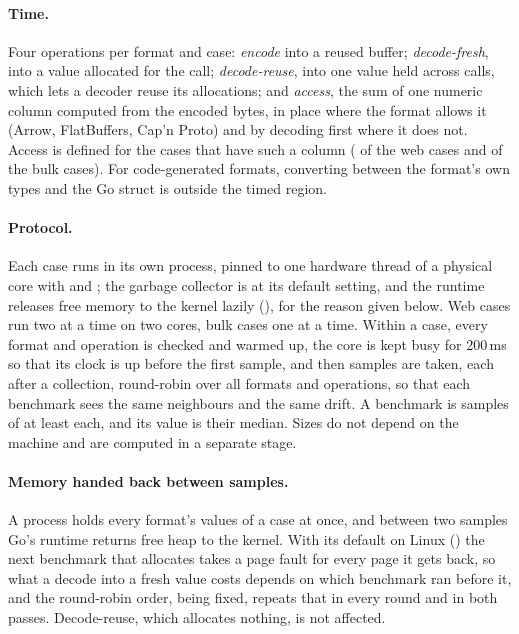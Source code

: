 \paragraph{Time.} Four operations per format and case:
\emph{encode} into a reused buffer; \emph{decode-fresh}, into a value
allocated for the call; \emph{decode-reuse}, into one value held across
calls, which lets a decoder reuse its allocations; and \emph{access}, the sum
of one numeric column computed from the encoded bytes, in place where the
format allows it (Arrow, FlatBuffers, Cap'n Proto) and by decoding first
where it does not. Access is defined for the cases that have such a column
( of the web cases and
 of the bulk cases).
For code-generated formats, converting between the format's own types and the
Go struct is outside the timed region.

\paragraph{Protocol.} Each case runs in its own process, pinned to one
hardware thread of a physical core with  and
; the garbage collector is at its default setting, and
the runtime releases free memory to the kernel lazily
(), for the reason given below. Web
cases run two at a time on two cores, bulk cases one at a time. Within a
case, every format and operation is checked and warmed up, the core is kept
busy for 200\,ms so that its clock is up before the first sample, and then
samples are taken, each after a collection, round-robin over all formats and operations, so that each
benchmark sees the same neighbours and the same drift. A benchmark is
 samples of at least  each, and
its value is their median. Sizes do not depend on the machine and are
computed in a separate stage.

\paragraph{Memory handed back between samples.} A process holds every
format's values of a case at once, and between two samples Go's runtime
returns free heap to the kernel. With its default on Linux
() the next benchmark that allocates takes a page
fault for every page it gets back, so what a decode into a fresh value
costs depends on which benchmark ran before it, and the round-robin order,
being fixed, repeats that in every round and in both passes. Decode-reuse,
which allocates nothing, is not affected.

